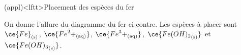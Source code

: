 \documentclass[a4paper, 10pt, landscape, twocolumn]{book}
\begin{document}
\begin{tcb*}[breakable](appl)<lftt>{Placement des espèces du fer}
	\noindent
	\begin{minipage}[c]{.5\linewidth}
		On donne l'allure du diagramme du fer ci-contre. Les espèces à placer sont
		$\ce{Fe}_{\rm(s)}$, $\ce{{Fe}^2+_{\rm(aq)}}$, $\ce{{Fe}^3+_{\rm(aq)}}$,
		$\ce{{Fe(OH)_2}_{\rm(s)}}$ et $\ce{{Fe(OH)_3}_{\rm(s)}}$.
	\end{minipage}
	\begin{minipage}[c]{.5\linewidth}
		\vspace{0pt}
		\begin{center}
\end{center}
\end{minipage}
\end{tcb*}
\end{document}
